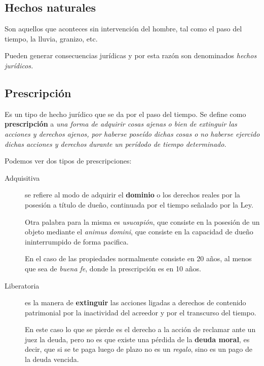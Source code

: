 \documentclass[../main.tex]{subfiles}
\begin{document}
\subsection{Hechos naturales}

Son aquellos que aconteces sin intervención del hombre, tal como el paso del tiempo,
la lluvia, granizo, etc.

Pueden generar consecuencias jurídicas y por esta razón son denominados \textit{hechos}
\textit{jurídicos.} 

\subsection{Prescripción}

Es un tipo de hecho jurídico que se da por el paso del tiempo.
Se define como \textbf{prescripción} a \textit{una forma de adquirir cosas ajenas}
\textit{o bien de extinguir las acciones y derechos ajenos, por haberse poseído}
\textit{dichas cosas o no haberse ejercido dichas acciones y derechos durante}
\textit{un perídodo de tiempo determinado.}

Podemos ver dos tipos de prescripciones:

\begin{description}
  \item[Adquisitiva] se refiere al modo de adquirir el \textbf{dominio} o los
    derechos reales por la posesión a título de dueño, continuada por el tiempo
    señalado por la Ley.

    Otra palabra para la misma es \textit{usucapión}, que consiste en la posesión
    de un objeto mediante el \textit{animus domini}, que consiste en la capacidad
    de dueño ininterrumpido de forma pacifica.

    En el caso de las propiedades normalmente consiste en 20 años, al menos que
    sea de \textit{buena fe}, donde la prescripción es en 10 años.

  \item[Liberatoria]  es la manera de \textbf{extinguir} las acciones ligadas a 
    derechos de contenido patrimonial por la inactividad del acreedor y por el
    transcurso del tiempo. 

    En este caso lo que se pierde es el derecho a la acción
    de reclamar ante un juez la deuda, pero no es que existe una pérdida de la
    \textbf{deuda moral}, es decir, que si se te paga luego de plazo no es un 
    \textit{regalo}, sino es un pago de la deuda vencida.
\end{description}
\end{document}
